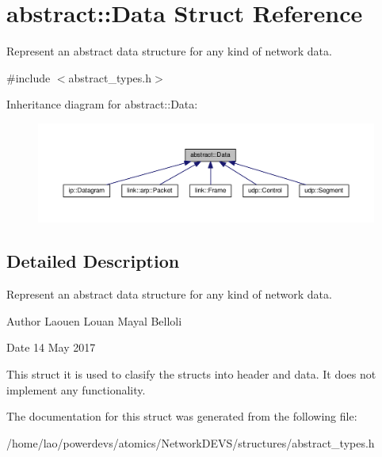 \hypertarget{structabstract_1_1Data}{}\section{abstract\+:\+:Data Struct Reference}
\label{structabstract_1_1Data}


Represent an abstract data structure for any kind of network data.  




{\ttfamily \#include $<$abstract\+\_\+types.\+h$>$}



Inheritance diagram for abstract\+:\+:Data\+:\nopagebreak
\begin{figure}[H]
\begin{center}
\leavevmode
\includegraphics[width=350pt]{structabstract_1_1Data__inherit__graph}
\end{center}
\end{figure}


\subsection{Detailed Description}
Represent an abstract data structure for any kind of network data. 

\begin{DoxyAuthor}{Author}
Laouen Louan Mayal Belloli 
\end{DoxyAuthor}
\begin{DoxyDate}{Date}
14 May 2017
\end{DoxyDate}
This struct it is used to clasify the structs into header and data. It does not implement any functionality. 

The documentation for this struct was generated from the following file\+:\begin{DoxyCompactItemize}
\item 
/home/lao/powerdevs/atomics/\+Network\+D\+E\+V\+S/structures/abstract\+\_\+types.\+h\end{DoxyCompactItemize}
